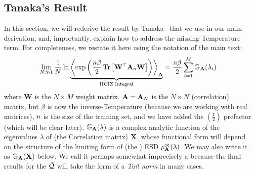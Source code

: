 \subsection{Tanaka's Result}
\label{sxn:tanaka}

In this section, we will rederive the result by Tanaka~\cite{Tanaka2007,Tanaka2008} that we use in our main derivation,
and, importantly, explain how to address the missing Temperature term.
For completeness, we restate it here using the notation of the main text:
\begin{equation}
  \label{eqn:hciz}
  \lim_{N \gg 1} \frac{1}{N} \ln 
\underbrace{
  \Expected[\mathbf{\AMAT}]{
    \exp\left(\frac{\ND\beta}{2}
    \Trace{\mathbf{W}^{\top} \AMATN \mathbf{W}}
    \right)
  }
 }_{\text{HCIZ Integral}}
  = \frac{\ND\beta}{2} \sum_{i=1}^{M} \GNORM(\lambda_{i})
\end{equation}
where 
$\mathbf{W}$ is the $N\times M$ \Teacher weight matrix, 
$\mathbf{A}=\mathbf{A}_N$ is the $N\times N$ \Student (correlation) matrix, 
but $\beta$ is now the inverse-Temperature (because we are working with real matrices), $n$ is the size of the training set, 
and we have added the  $(\tfrac{1}{2})$ prefactor (which will be clear later).
$\mathbb{G}_{\mathbf{A}}(\lambda)$ is a complex analytic function of the eigenvalues $\lambda$ of (the \Teacher Correlation matrix) $\mathbf{X}$, 
whose functional form will depend on the structure of the limiting form of (the \Student) ESD $\rho_{\mathbf{A}}^{\infty}(\lambda)$.
We may also write it as $\mathbb{G}_{\mathbf{A}}(\mathbf{X})$ below.
We call it perhaps somewhat imprecisely a  \emph{\GEN} because the final results for the \LayerQuality  $\bar{\mathcal{Q}}$ will take the form of a \emph{Tail norm} in many cases.


